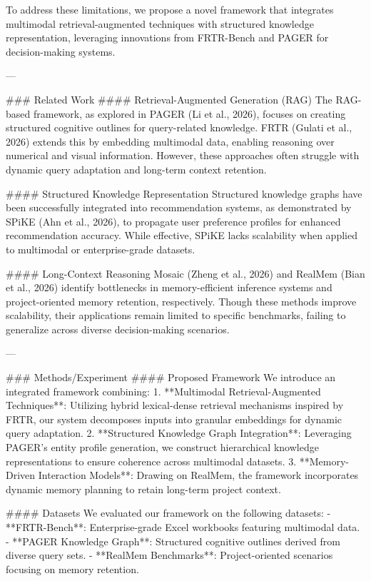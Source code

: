 To address these limitations, we propose a novel framework that integrates multimodal retrieval-augmented techniques with structured knowledge representation, leveraging innovations from FRTR-Bench and PAGER for decision-making systems.

---

### Related Work  
#### Retrieval-Augmented Generation (RAG)  
The RAG-based framework, as explored in PAGER (Li et al., 2026), focuses on creating structured cognitive outlines for query-related knowledge. FRTR (Gulati et al., 2026) extends this by embedding multimodal data, enabling reasoning over numerical and visual information. However, these approaches often struggle with dynamic query adaptation and long-term context retention.

#### Structured Knowledge Representation  
Structured knowledge graphs have been successfully integrated into recommendation systems, as demonstrated by SPiKE (Ahn et al., 2026), to propagate user preference profiles for enhanced recommendation accuracy. While effective, SPiKE lacks scalability when applied to multimodal or enterprise-grade datasets.

#### Long-Context Reasoning  
Mosaic (Zheng et al., 2026) and RealMem (Bian et al., 2026) identify bottlenecks in memory-efficient inference systems and project-oriented memory retention, respectively. Though these methods improve scalability, their applications remain limited to specific benchmarks, failing to generalize across diverse decision-making scenarios.

---

### Methods/Experiment  
#### Proposed Framework  
We introduce an integrated framework combining:  
1. **Multimodal Retrieval-Augmented Techniques**: Utilizing hybrid lexical-dense retrieval mechanisms inspired by FRTR, our system decomposes inputs into granular embeddings for dynamic query adaptation.  
2. **Structured Knowledge Graph Integration**: Leveraging PAGER's entity profile generation, we construct hierarchical knowledge representations to ensure coherence across multimodal datasets.  
3. **Memory-Driven Interaction Models**: Drawing on RealMem, the framework incorporates dynamic memory planning to retain long-term project context.

#### Datasets  
We evaluated our framework on the following datasets:  
- **FRTR-Bench**: Enterprise-grade Excel workbooks featuring multimodal data.  
- **PAGER Knowledge Graph**: Structured cognitive outlines derived from diverse query sets.  
- **RealMem Benchmarks**: Project-oriented scenarios focusing on memory retention.

